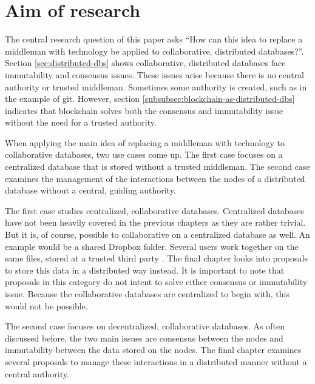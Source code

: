 \chapter{Aim of research}

\iffalse
- start with consensus and consistency in col. distr. dbs => because no central authority
- pivot into main idea: have technology replace an indispensable middleman. As discussed in \ref{subsec:examples-distributed-dbs}, blockchains solve both issues very well. 
- to apply the main idea to collaborative databases: two approaches. First a centralized collaborative database can be stored without a middleman. Second, the interaction between a nodes of a distributed collaborative database can be managed without a middleman
- For the first approach, the final chapter looks into proposals to store data in a distributed manner. Every proposal is examined on advantages, disadvantages, viability and current implementations.
- Concerning the second approach, the last chapter focuses on proposals to manage the interaction 
\fi

The central research question of this paper asks ``How can this idea to replace a middleman with technology be applied to collaborative, distributed databases?''. Section \ref{sec:distributed-dbs} shows collaborative, distributed databases face immutability and consensus issues. These issues arise because there is no central authority or trusted middleman. Sometimes some authority is created, such as in the example of git. However, section \ref{subsubsec:blockchain-as-distributed-dbs} indicates that blockchain solves both the consensus and immutability issue without the need for a trusted authority.

When applying the main idea of replacing a middleman with technology to collaborative databases, two use cases come up. The first case focuses on a centralized database that is stored without a trusted middleman. The second case examines the management of the interactions between the nodes of a distributed database without a central, guiding authority.

The first case studies centralized, collaborative databases. Centralized databases have not been heavily covered in the previous chapters as they are rather trivial. But it is, of course, possible to collaborative on a centralized database as well. An example would be a shared Dropbox folder. Several users work together on the same files, stored at a trusted third party \cite{dropbox-sharing}. The final chapter looks into proposals to store this data in a distributed way instead. It is important to note that proposals in this category do not intent to solve either consensus or immutability issue. Because the collaborative databases are centralized to begin with, this would not be possible.

The second case focuses on decentralized, collaborative databases. As often discussed before, the two main issues are consensus between the nodes and immutability between the data stored on the nodes. The final chapter examines several proposals to manage these interactions in a distributed manner without a central authority.


